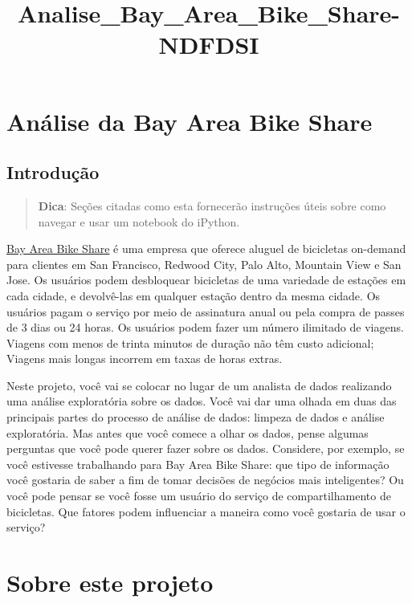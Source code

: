 \documentclass[11pt]{article}
\title{Analise\_Bay\_Area\_Bike\_Share-NDFDSI}
\begin{document}
    
    
    \maketitle
    
    

    
    \section{Análise da Bay Area Bike
Share}\label{anuxe1lise-da-bay-area-bike-share}

\subsection{Introdução}\label{introduuxe7uxe3o}

\begin{quote}
\textbf{Dica}: Seções citadas como esta fornecerão instruções úteis
sobre como navegar e usar um notebook do iPython.
\end{quote}

\href{http://www.bayareabikeshare.com/}{Bay Area Bike Share} é uma
empresa que oferece aluguel de bicicletas on-demand para clientes em San
Francisco, Redwood City, Palo Alto, Mountain View e San Jose. Os
usuários podem desbloquear bicicletas de uma variedade de estações em
cada cidade, e devolvê-las em qualquer estação dentro da mesma cidade.
Os usuários pagam o serviço por meio de assinatura anual ou pela compra
de passes de 3 dias ou 24 horas. Os usuários podem fazer um número
ilimitado de viagens. Viagens com menos de trinta minutos de duração não
têm custo adicional; Viagens mais longas incorrem em taxas de horas
extras.

Neste projeto, você vai se colocar no lugar de um analista de dados
realizando uma análise exploratória sobre os dados. Você vai dar uma
olhada em duas das principais partes do processo de análise de dados:
limpeza de dados e análise exploratória. Mas antes que você comece a
olhar os dados, pense algumas perguntas que você pode querer fazer sobre
os dados. Considere, por exemplo, se você estivesse trabalhando para Bay
Area Bike Share: que tipo de informação você gostaria de saber a fim de
tomar decisões de negócios mais inteligentes? Ou você pode pensar se
você fosse um usuário do serviço de compartilhamento de bicicletas. Que
fatores podem influenciar a maneira como você gostaria de usar o
serviço?

    \section{Sobre este projeto}\label{sobre-este-projeto}
\end{document}
